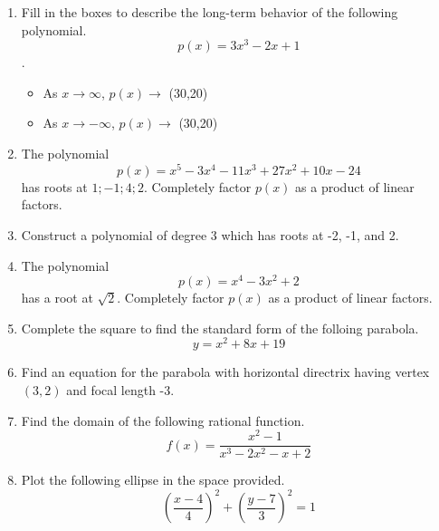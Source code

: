 \documentclass{article}
\begin{document}
\ReviewTitle[class={College Algebra}, for={Test 3}]

\begin{enumerate}
\item Fill in the boxes to describe the long-term behavior of the following polynomial. \[ p(x) = 3x^3 - 2x + 1 \].

\begin{itemize}
\item As $x \rightarrow \infty$, $p(x) \rightarrow$ \framebox(30,20){} \vspace{0.5cm}
\item As $x \rightarrow -\infty$, $p(x) \rightarrow$ \framebox(30,20){}
\end{itemize} \vspace{1cm}

\item The polynomial \[ p(x) = x^5 - 3x^4 - 11x^3 + 27x^2 + 10x - 24 \] has roots at ${1;-1;4;2}$. Completely factor $p(x)$ as a product of linear factors. \vspace{6cm}

\item Construct a polynomial of degree 3 which has roots at -2, -1, and 2. \vspace{5cm}

\newpage

\item The polynomial \[ p(x) = x^4 - 3x^2 + 2 \] has a root at $\sqrt{2}$. Completely factor $p(x)$ as a product of linear factors. \vspace{9cm}

\item Complete the square to find the standard form of the folloing parabola. \[ y = x^2 + 8x + 19 \] \vspace{6cm}

\item Find an equation for the parabola with horizontal directrix having vertex $(3, 2)$ and focal length -3. \vspace{2cm}

\newpage

\item Find the domain of the following rational function. \[ f(x) = \frac{x^2 - 1}{x^3 - 2x^2 - x + 2} \] \vspace{5cm}

\item Plot the following ellipse in the space provided. \[ \left(\frac{x - 4}{4}\right)^2 + \left(\frac{y - 7}{3}\right)^2 = 1 \]


\end{enumerate}
\end{document}
